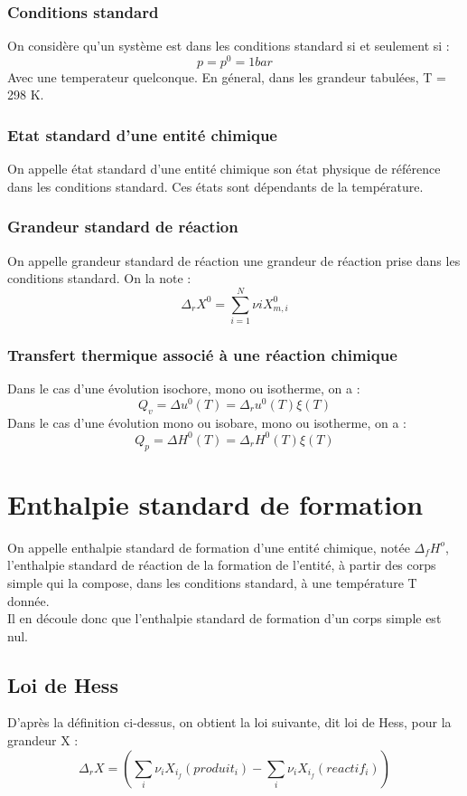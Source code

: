 \subsection{Conditions standard}
\begin{de}
 On considère qu'un système est dans les conditions standard si et seulement si :
$$p = p^0 = 1 bar$$
Avec une temperateur quelconque.
En géneral, dans les grandeur tabulées, T = 298 K.
\end{de}
\subsection{Etat standard d'une entité chimique}
\begin{de}
 On appelle état standard d'une entité chimique son état physique de référence dans les conditions standard. Ces états sont dépendants de la température.
\end{de}
\subsection{Grandeur standard de réaction}
\begin{de}
 On appelle grandeur standard de réaction une grandeur de réaction prise dans les conditions standard. On la note :
$$\Delta_r X^0 = \sum_{i=1}^N \nu i X_{m,i}^0$$
\end{de}
\subsection{Transfert thermique associé à une réaction chimique}
Dans le cas d'une évolution isochore, mono ou isotherme, on a :
$$Q_v = \Delta u^0 (T) = \Delta_r u^0(T) \xi(T)$$
Dans le cas d'une évolution mono ou isobare, mono ou isotherme, on a :
$$Q_p = \Delta H^0 (T) = \Delta_r H^0(T) \xi(T)$$
\chapter{Enthalpie standard de formation}
\begin{de}
On appelle enthalpie standard de formation d'une entité chimique, notée $\Delta_f H^o$, l'enthalpie standard de réaction de la formation de l'entité, à partir des corps simple qui la compose, dans les conditions standard, à une température T donnée.\\
Il en découle donc que l'enthalpie standard de formation d'un corps simple est nul.
\end{de}
\section{Loi de Hess}
D'après la définition ci-dessus, on obtient la loi suivante, dit loi de Hess, pour la grandeur X :
$$\Delta_r X = (\sum_i \nu_i X_{i_f} (produit_i) - \sum_i \nu_i X_{i_f} (reactif_i))$$
